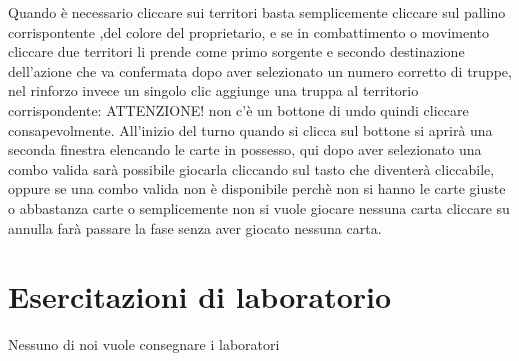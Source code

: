 \documentclass[a4paper,12pt]{report}
\begin{document}
 Quando è necessario cliccare sui territori basta semplicemente cliccare sul pallino corrispontente ,del colore del proprietario, e se in combattimento o movimento cliccare due territori li prende come primo sorgente e secondo destinazione dell'azione che va confermata dopo aver selezionato un numero corretto di truppe, nel rinforzo invece un singolo clic aggiunge una truppa al territorio corrispondente: ATTENZIONE! non c'è un bottone di undo quindi cliccare consapevolmente.
 All'inizio del turno quando si clicca sul bottone si aprirà una seconda finestra elencando le carte in possesso, qui dopo aver selezionato una combo valida sarà possibile giocarla cliccando sul tasto che diventerà cliccabile, oppure se una combo valida non è disponibile perchè non si hanno le carte giuste o abbastanza carte o semplicemente non si vuole giocare nessuna carta cliccare su annulla farà passare la fase senza aver giocato nessuna carta. 
\chapter{Esercitazioni di laboratorio}
Nessuno di noi vuole consegnare i laboratori
\end{document}
